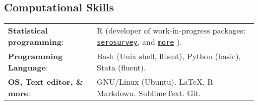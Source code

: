 \documentclass[margin,line]{res}
\begin{document}
\begin{resume}
\section{\sc Computational Skills}
\begin{tabular}{ l l}
	{\bf Statistical programming}: & R (developer of work-in-progress packages: %
	\href{https://avallecam.github.io/serosurvey/}{\texttt{serosurvey}}, and
	\href{https://avallecam.github.io/avallecam/#portfolio}{\texttt{more}}%
	).\\ 
	{\bf Programming Language}: & Bash (Unix shell, fluent), Python (basic), Stata (fluent).\\ %
	{\bf OS, Text editor, \& more}: & GNU/Linux (Ubuntu). \LaTeX, R Markdown. SublimeText. Git.\\ %
\end{tabular}


\end{resume}
\end{document}
